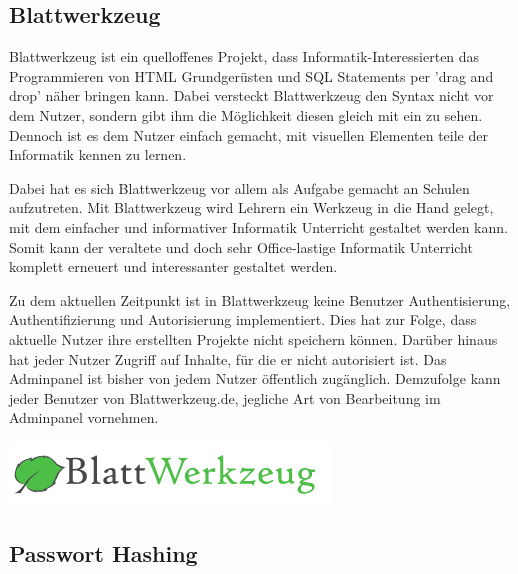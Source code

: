 \documentclass[11pt]{article}
\begin{document}
		\subsection{Blattwerkzeug}
		\label{sec:blattwerkzeug}
	
		\begin{flushleft}
			Blattwerkzeug ist ein quelloffenes Projekt, dass Informatik-Interessierten das Programmieren von HTML Grundgerüsten und SQL Statements per 'drag and drop' näher bringen kann. Dabei versteckt Blattwerkzeug den Syntax nicht vor dem Nutzer, sondern gibt ihm die Möglichkeit diesen gleich mit ein zu sehen. Dennoch ist es dem Nutzer einfach gemacht, mit visuellen Elementen teile der Informatik kennen zu lernen.\par\bigskip
			
			Dabei hat es sich Blattwerkzeug vor allem als Aufgabe gemacht an Schulen aufzutreten. Mit Blattwerkzeug wird Lehrern ein Werkzeug in die Hand gelegt, mit dem einfacher und informativer Informatik Unterricht gestaltet werden kann. Somit kann der veraltete und doch sehr Office-lastige Informatik Unterricht komplett erneuert und interessanter gestaltet werden.\par\bigskip
			
			Zu dem aktuellen Zeitpunkt ist in Blattwerkzeug keine Benutzer Authentisierung, Authentifizierung und Autorisierung implementiert. Dies hat zur Folge, dass aktuelle Nutzer ihre erstellten Projekte nicht speichern können. Darüber hinaus hat jeder Nutzer Zugriff auf Inhalte, für die er nicht autorisiert ist. Das Adminpanel ist bisher von jedem Nutzer öffentlich zugänglich. Demzufolge kann jeder Benutzer von Blattwerkzeug.de, jegliche Art von Bearbeitung im Adminpanel vornehmen.
		\end{flushleft}
	
		\begin{center}
			\includegraphics[scale=0.5]{blattwerkzeug.png}
		\end{center}


		\subsection{Passwort Hashing}
		\label{sec:password_hashing}
	
\end{document}
